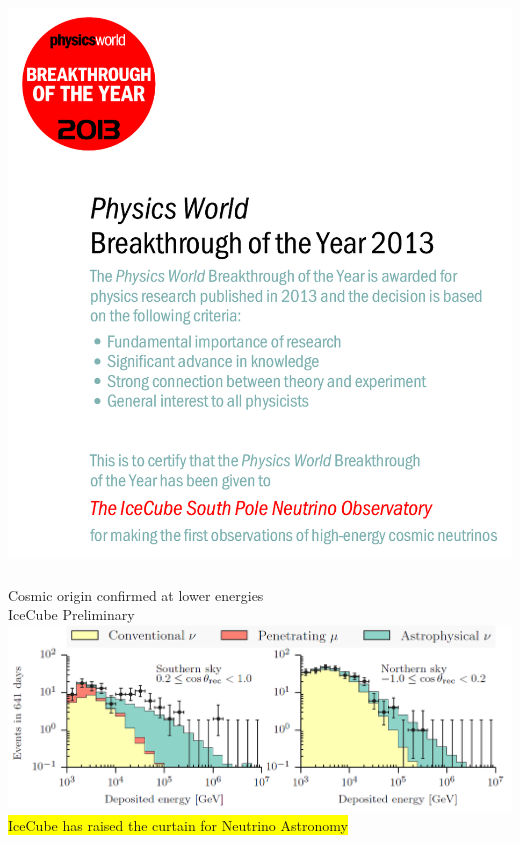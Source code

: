 \Tr
\onecolumn
\begin{center}
\includegraphics[keepaspectratio,height=15cm]{breakthrough}\\
\end{center}

\Tr
\onecolumn
\begin{center}
{\blue Cosmic origin confirmed at lower energies}\\[5mm]
{\red IceCube Preliminary}\\
\includegraphics[keepaspectratio,width=25cm]{mese}\\[1cm]
\colorbox{yellow}{IceCube has raised the curtain for Neutrino Astronomy}
\end{center}

